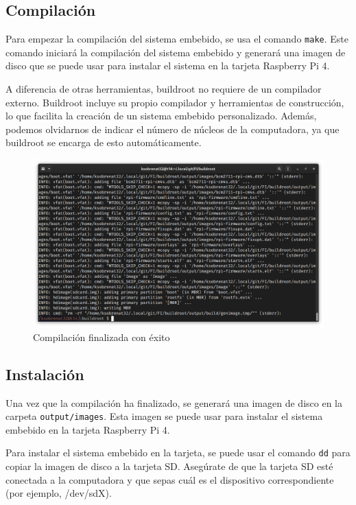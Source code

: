 \documentclass[12pt, letterpaper]{article}
\begin{document}
	\subsection{Compilación}

	Para empezar la compilación del sistema embebido, se usa el comando \texttt{make}. Este comando iniciará la compilación del sistema embebido y generará una imagen de disco que se puede usar para instalar el sistema en la tarjeta Raspberry Pi 4.

	A diferencia de otras herramientas, buildroot no requiere de un compilador externo. Buildroot incluye su propio compilador y herramientas de construcción, lo que facilita la creación de un sistema embebido personalizado. Además, podemos olvidarnos de indicar el número de núcleos de la computadora, ya que buildroot se encarga de esto automáticamente.

	\begin{figure}[H]
		\centering
		\begin{center}
			\includegraphics[width=\textwidth]{img/make-compile}
			\caption{Compilación finalizada con éxito}
			\label{fig:make-compile}
		\end{center}
	\end{figure}

	\subsection{Instalación}

	Una vez que la compilación ha finalizado, se generará una imagen de disco en la carpeta \texttt{output/images}. Esta imagen se puede usar para instalar el sistema embebido en la tarjeta Raspberry Pi 4.

	Para instalar el sistema embebido en la tarjeta, se puede usar el comando \texttt{dd} para copiar la imagen de disco a la tarjeta SD. Asegúrate de que la tarjeta SD esté conectada a la computadora y que sepas cuál es el dispositivo correspondiente (por ejemplo, /dev/sdX).
\end{document}
